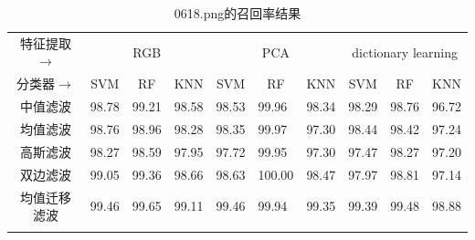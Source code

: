 \documentclass[12pt,hyperref,a4paper,UTF8]{ctexart}
\begin{document}
{\begin{table}[!h]
	\vspace{1cm}
	\centering
	\caption{0618.png的召回率结果}
	\label{tab:recall0618}
	\begin{tabular}{@{}clllllllll@{}}
		\hline
		特征提取$\rightarrow$    & \multicolumn{3}{c}{RGB}                                                    & \multicolumn{3}{c}{PCA}                                                    & \multicolumn{3}{c}{dictionary learning}                                    \\
		分类器$\rightarrow$     & \multicolumn{1}{c}{SVM} & \multicolumn{1}{c}{RF} & \multicolumn{1}{c}{KNN} & \multicolumn{1}{c}{SVM} & \multicolumn{1}{c}{RF} & \multicolumn{1}{c}{KNN} & \multicolumn{1}{c}{SVM} & \multicolumn{1}{c}{RF} & \multicolumn{1}{c}{KNN} \\
		\hline
		中值滤波                 & 98.78                   & 99.21                  & 98.58                   & 98.53                   & 99.96                  & 98.34                   & 98.29                   & 98.76                  & 96.72                   \\
		均值滤波                 & 98.76                   & 98.96                  & 98.28                   & 98.35                   & 99.97                  & 97.30                   & 98.44                   & 98.42                  & 97.24                   \\
		高斯滤波                 & 98.27                   & 98.59                  & 97.95                   & 97.72                   & 99.95                  & 97.30                   & 97.47                   & 98.27                  & 97.20                   \\
		双边滤波                 & 99.05                   & 99.36                  & 98.66                   & 98.63                   & 100.00                 & 98.47                   & 97.97                   & 98.81                  & 97.14                   \\
		均值迁移滤波               & 99.46                   & 99.65                  & 99.11                   & 99.46                   & 99.94                  & 99.35                   & 99.39                   & 99.48                  & 98.88                   \\
		\hline
		\multicolumn{1}{l}{} &                         &                        &                         &                         &                        &                         &                         &                        &                         \\

\end{tabular}
\end{table}}
\end{document}
